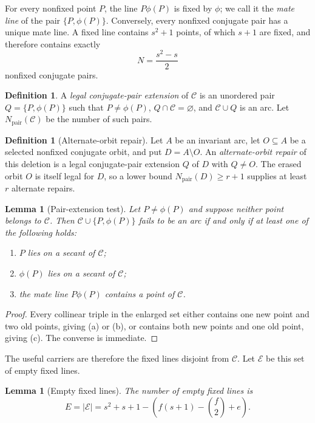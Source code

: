 \documentclass[11pt]{article}
\newtheorem{lemma}[theorem]{Lemma}
\theoremstyle{definition}
\newtheorem{definition}[theorem]{Definition}
\theoremstyle{remark}
\newcommand{\cC}{\mathcal{C}}
\newcommand{\cE}{\mathcal{E}}
\newcommand{\Npair}{N_{\mathrm{pair}}}
\begin{document}
For every nonfixed point $P$, the line $P\phi(P)$ is fixed by $\phi$; we
call it the \emph{mate line} of the pair $\{P,\phi(P)\}$.  Conversely, every
nonfixed conjugate pair has a unique mate line.  A fixed line contains
$s^2+1$ points, of which $s+1$ are fixed, and therefore contains exactly
\[
  N=\frac{s^2-s}{2}
\]
nonfixed conjugate pairs.

\begin{definition}\label{def:legal-pair}
A \emph{legal conjugate-pair extension} of $\cC$ is an unordered pair
$Q=\{P,\phi(P)\}$ such that $P\ne\phi(P)$, $Q\cap\cC=\varnothing$, and
$\cC\cup Q$ is an arc.  Let $\Npair(\cC)$ be the number of such pairs.
\end{definition}

\begin{definition}[Alternate-orbit repair]\label{def:alternate-repair}
Let $A$ be an invariant arc, let $O\subseteq A$ be a selected nonfixed
conjugate orbit, and put $D=A\setminus O$.  An \emph{alternate-orbit repair}
of this deletion is a legal conjugate-pair extension $Q$ of $D$ with
$Q\ne O$.  The erased orbit $O$ is itself legal for $D$, so a lower bound
$\Npair(D)\ge r+1$ supplies at least $r$ alternate repairs.
\end{definition}

\begin{lemma}[Pair-extension test]\label{lem:pair-test}
Let $P\ne\phi(P)$ and suppose neither point belongs to $\cC$.  Then
$\cC\cup\{P,\phi(P)\}$ fails to be an arc if and only if at least one of the
following holds:
\begin{enumerate}[label=(\alph*),leftmargin=2em]
\item $P$ lies on a secant of $\cC$;
\item $\phi(P)$ lies on a secant of $\cC$;
\item the mate line $P\phi(P)$ contains a point of $\cC$.
\end{enumerate}
\end{lemma}

\begin{proof}
Every collinear triple in the enlarged set either contains one new point
and two old points, giving (a) or (b), or contains both new points and one
old point, giving (c).  The converse is immediate.
\end{proof}

The useful carriers are therefore the fixed lines disjoint from $\cC$.
Let $\cE$ be this set of empty fixed lines.

\begin{lemma}[Empty fixed lines]\label{lem:empty-lines}
The number of empty fixed lines is
\begin{equation}\label{eq:E}
 E=|\cE|=s^2+s+1-\left(f(s+1)-\binom f2+e\right).
\end{equation}
\end{lemma}
\end{document}
